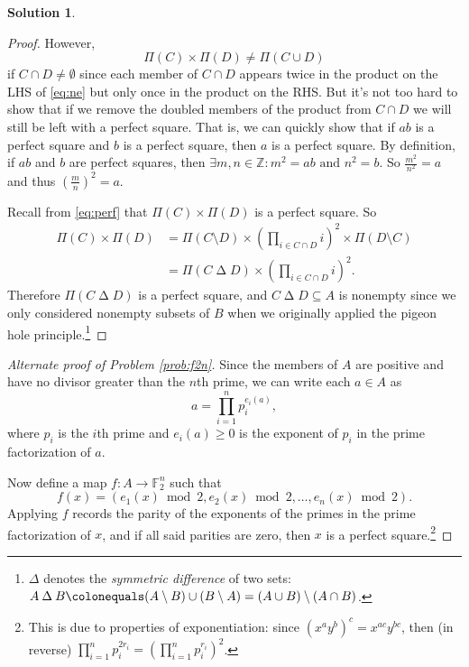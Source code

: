 \documentclass{article}
\theoremstyle{definition}
\newtheorem{sol}{Solution}
\theoremstyle{plain}
\newcommand{\elemp}[1]{\Pi(#1)}
\newcommand{\defeq}{\colonequals}
\newcommand{\symdiff}{\mathbin{\Delta}}
\newcommand{\Z}{\mathbb{Z}}
\begin{document}
\begin{sol}
\begin{proof}
However,
\begin{equation}\label{eq:ne}
\elemp{C} \times \elemp{D} \neq \elemp{C \cup D}
\end{equation}
if $C \cap D \neq \emptyset$ since each member of $C \cap D$ appears twice in the product on the LHS of \eqref{eq:ne} but only once in the product on the RHS. But it's not too hard to show that if we remove the doubled members of the product from $C \cap D$ we will still be left with a perfect square. That is, we can quickly show that if $ab$ is a perfect square and $b$ is a perfect square, then $a$ is a perfect square. By definition, if $ab$ and $b$ are perfect squares, then $\exists m,n \in \Z: m^2 = ab \text{ and } n^2 = b$. So $\frac{m^2}{n^2} = a$ and thus $(\frac{m}{n})^2 = a$.

Recall from \eqref{eq:perf} that $\elemp{C}\times\elemp{D}$ is a perfect square. So
\begin{align*}
\elemp{C} \times \elemp{D} &= \elemp{C \setminus D} \times \left(\prod_{i \in C \cap D} i\right)^2 \times \elemp{D \setminus C}\\
&= \elemp{C \symdiff D} \times \left(\prod_{i \in C \cap D} i\right)^2.
\end{align*}
Therefore $\elemp{C \symdiff D}$ is a perfect square, and $C \symdiff D \subseteq A$ is nonempty since we only considered nonempty subsets of $B$ when we originally applied the pigeon hole principle.\footnote{$\symdiff$ denotes the \textit{symmetric difference} of two sets: $A \symdiff B \defeq (A \setminus B) \cup (B \setminus A) = (A \cup B) \setminus (A \cap B)$.}
\end{proof}

\begin{proof}[Alternate proof of Problem \ref{prob:f2n}] %
Since the members of $A$ are positive and have no divisor greater than the $n$th prime, we can write each $a \in A$ as
\[
a = \prod_{i=1}^n p_i^{e_i(a)},
\]
where $p_i$ is the $i$th prime and $e_i(a) \ge 0$ is the exponent of $p_i$ in the prime factorization of $a$.

Now define a map $f : A \rightarrow \mathbb{F}_2^n$ such that
\[
f(x) = (e_1(x) \bmod 2, e_2(x) \bmod 2, \dots, e_n(x) \bmod 2).
\]
Applying $f$ records the parity of the exponents of the primes in the prime factorization of $x$, and if all said parities are zero, then $x$ is a perfect square.\footnote{This is due to properties of exponentiation: since ${(x^ay^b)}^c = x^{ac}y^{bc}$, then (in reverse) $\prod_{i = 1}^np_i^{2r_i} = ({\prod_{i=1}^np_i^{r_i}})^2$.}


\end{proof}
\end{sol}
\end{document}
